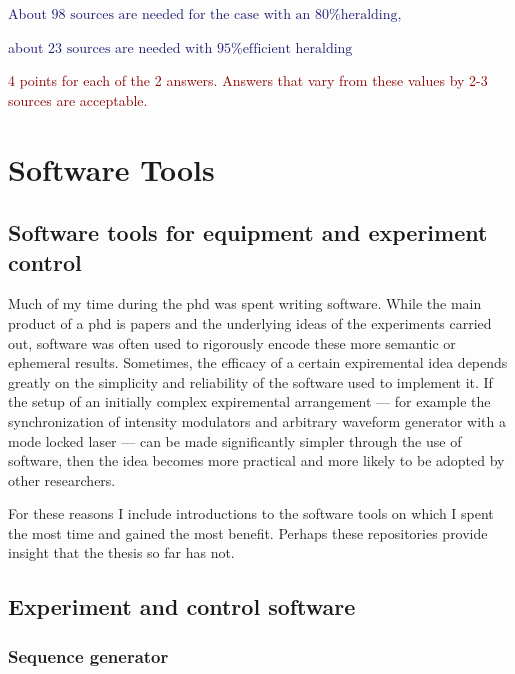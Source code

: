 \documentclass[11pt]{caltech_thesis} %
\begin{document}
\begin{enumerate}
  \textcolor{midnightblue}{About $\boxed{\text{98 sources are needed for the case with an 80\% heralding}}$, }

  \textcolor{midnightblue}{about $\boxed{\text{23 sources are needed with 95\% efficient heralding}}$}

  \textcolor{darkred}{ 4 points for each of the 2 answers. Answers that vary from these values by 2-3 sources are acceptable. }
\end{enumerate}

\hypertarget{software-tools}{%
\chapter{Software Tools}\label{software-tools}}

\hypertarget{software-tools-for-equipment-and-experiment-control}{%
\section{Software tools for equipment and experiment control}\label{software-tools-for-equipment-and-experiment-control}}

Much of my time during the phd was spent writing software. While the main product of a phd is papers and the underlying ideas of the experiments carried out, software was often used to rigorously encode these more semantic or ephemeral results. Sometimes, the efficacy of a certain expiremental idea depends greatly on the simplicity and reliability of the software used to implement it. If the setup of an initially complex expiremental arrangement --- for example the synchronization of intensity modulators and arbitrary waveform generator with a mode locked laser --- can be made significantly simpler through the use of software, then the idea becomes more practical and more likely to be adopted by other researchers.

For these reasons I include introductions to the software tools on which I spent the most time and gained the most benefit. Perhaps these repositories provide insight that the thesis so far has not.

\hypertarget{experiment-and-control-software}{%
\section{Experiment and control software}\label{experiment-and-control-software}}

\hypertarget{sequence-generator}{%
\subsection{Sequence generator}\label{sequence-generator}}
\end{document}
